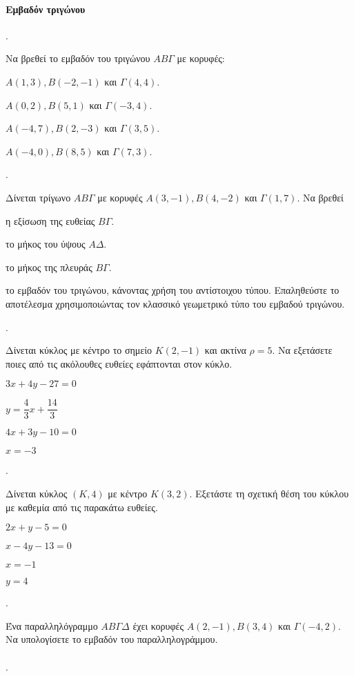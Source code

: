 \documentclass[11pt,a4paper,twocolumn]{article}
\newcounter{askhsh}
\newcommand{\askhsh}{\large\theaskhsh.\ \addtocounter{askhsh}{1}}
\begin{document}
\paragraph{Εμβαδόν τριγώνου}
\askhsh Να βρεθεί το εμβαδόν του τριγώνου $AB\varGamma$ με κορυφές:
\begin{alist}
\item $A(1,3),B(-2,-1)$ και $\varGamma(4,4)$.
\item $A(0,2),B(5,1)$ και $\varGamma(-3,4)$.
\item $A(-4,7),B(2,-3)$ και $\varGamma(3,5)$.
\item $A(-4,0),B(8,5)$ και $\varGamma(7,3)$.
\end{alist}
\askhsh Δίνεται τρίγωνο $AB\varGamma$ με κορυφές $A(3,-1), B(4,-2)$ και $\varGamma(1,7)$. Να βρεθεί
\begin{alist}
\item η εξίσωση της ευθείας $B\varGamma$.
\item το μήκος του ύψους $A\varDelta$.
\item το μήκος της πλευράς $B\varGamma$.
\item το εμβαδόν του τριγώνου, κάνοντας χρήση του αντίστοιχου τύπου. Επαληθεύστε το αποτέλεσμα χρησιμοποιώντας τον κλασσικό γεωμετρικό τύπο του εμβαδού τριγώνου.
\end{alist}
\askhsh Δίνεται κύκλος με κέντρο το σημείο $K(2,-1)$ και ακτίνα $\rho=5$. Να εξετάσετε ποιες από τις ακόλουθες ευθείες εφάπτονται στον κύκλο.
\begin{multicols}{2}
\begin{alist}
\item $3x+4y-27=0$
\item $y=\dfrac{4}{3}x+\dfrac{14}{3}$
\item $4x+3y-10=0$
\item $x=-3$
\end{alist}
\end{multicols}
\askhsh Δίνεται κύκλος $(K,4)$ με κέντρο $K(3,2)$. Εξετάστε τη σχετική θέση του κύκλου με καθεμία από τις παρακάτω ευθείες.
\begin{multicols}{2}
\begin{alist}
\item $2x+y-5=0$
\item $x-4y-13=0$
\item $x=-1$
\item $y=4$
\end{alist}
\end{multicols}
\askhsh Ένα παραλληλόγραμμο $AB\varGamma\varDelta$ έχει κορυφές $A(2,-1),B(3,4)$ και $\varGamma(-4,2)$. Να υπολογίσετε το εμβαδόν του παραλληλογράμμου.\\\\
\askhsh
\end{document}
